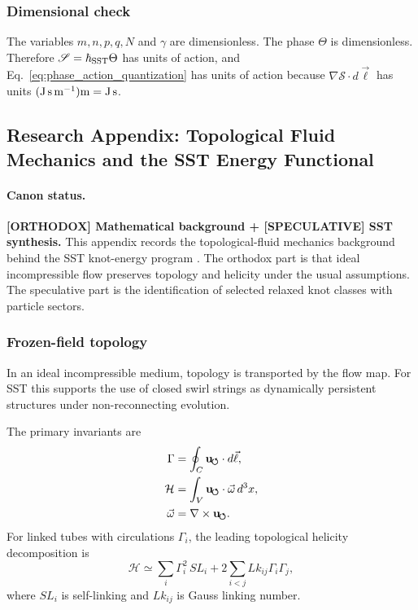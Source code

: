 \subsubsection{Dimensional check}
The variables $m,n,p,q,N$ and $\gamma$ are dimensionless. The phase $\Theta$ is dimensionless. Therefore $\mathscr S=\hbar_{\rm SST}\Theta$ has units of action, and Eq.~\eqref{eq:phase_action_quantization} has units of action because $\nabla\mathscr S\cdot d\vec\ell$ has units $({\rm J\,s\,m^{-1}}){\rm m}={\rm J\,s}$.

\subsection{Research Appendix: Topological Fluid Mechanics and the SST Energy Functional}
\label{app:tfm_energy_functional}

\paragraph{Canon status.}
\textbf{[ORTHODOX] Mathematical background + [SPECULATIVE] SST synthesis.}
This appendix records the topological-fluid mechanics background behind the SST knot-energy program \cite{Moffatt1969,Ricca1998KnotFluidMechanics}. The orthodox part is that ideal incompressible flow preserves topology and helicity under the usual assumptions. The speculative part is the identification of selected relaxed knot classes with particle sectors.

\subsubsection{Frozen-field topology}
In an ideal incompressible medium, topology is transported by the flow map. For SST this supports the use of closed swirl strings as dynamically persistent structures under non-reconnecting evolution.

The primary invariants are
\begin{align}
    \Gamma &= \oint_C \mathbf{u}_{\!\boldsymbol{\circlearrowleft}}\cdot d\vec\ell,\label{eq:gamma_appendix}\\
    \mathcal H &= \int_V \mathbf{u}_{\!\boldsymbol{\circlearrowleft}}\cdot\vec\omega\,d^3x,\label{eq:helicity_appendix}\\
    \vec\omega &= \nabla\times\mathbf{u}_{\!\boldsymbol{\circlearrowleft}}.\label{eq:vorticity_appendix}
\end{align}
For linked tubes with circulations $\Gamma_i$, the leading topological helicity decomposition is
\begin{equation}
    \mathcal H
    \simeq
    \sum_i \Gamma_i^2\,SL_i
    +2\sum_{i<j}Lk_{ij}\Gamma_i\Gamma_j,
    \label{eq:helicity_link_decomposition}
\end{equation}
where $SL_i$ is self-linking and $Lk_{ij}$ is Gauss linking number.

